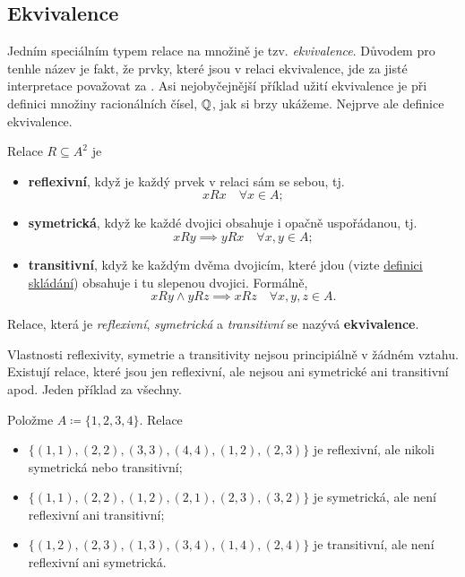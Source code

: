 \subsection{Ekvivalence}
\label{ssec:ekvivalence}

Jedním speciálním typem relace na množině je tzv. \emph{ekvivalence}. Důvodem
pro tenhle název je fakt, že prvky, které jsou v relaci ekvivalence, jde za jisté
interpretace považovat za . Asi nejobyčejnější příklad užití
ekvivalence je při definici množiny racionálních čísel, $\mathbb{Q}$, jak si brzy
ukážeme. Nejprve ale definice ekvivalence.

\begin{definition}[Ekvivalence]
 Relace $R \subseteq A^2$ je
 \begin{itemize}
  \item \textbf{reflexivní}, když je každý prvek v relaci sám se sebou, tj.
   \[
    xRx \quad \forall x \in A;
   \]
  \item \textbf{symetrická}, když ke každé dvojici obsahuje i opačně
   uspořádanou, tj.
   \[
    xRy \implies yRx \quad \forall x,y \in A;
   \]
  \item \textbf{transitivní}, když ke každým dvěma dvojicím, které jdou
    (vizte \hyperref[def:slozeni-relaci]{definici
   skládání}) obsahuje i tu slepenou dvojici. Formálně,
   \[
    xRy \wedge yRz \implies xRz \quad \forall x,y,z \in A.
   \]
 \end{itemize}
 Relace, která je \emph{reflexivní}, \emph{symetrická} a \emph{transitivní} se
 nazývá \textbf{ekvivalence}.
\end{definition}

Vlastnosti reflexivity, symetrie a transitivity nejsou principiálně v žádném
vztahu. Existují relace, které jsou jen reflexivní, ale nejsou ani symetrické
ani transitivní apod. Jeden příklad za všechny.

\begin{example}
 Položme $A \coloneqq \{1,2,3,4\}$. Relace
 \begin{itemize}
  \item $\{(1,1),(2,2),(3,3),(4,4),(1,2),(2,3)\}$ je reflexivní, ale nikoli
   symetrická nebo transitivní;
  \item $\{(1,1),(2,2),(1,2),(2,1),(2,3),(3,2)\}$ je symetrická, ale není
   reflexivní ani transitivní;
  \item $\{(1,2),(2,3),(1,3),(3,4),(1,4),(2,4)\}$ je transitivní, ale není
   reflexivní ani symetrická.
 \end{itemize}
\end{example}

